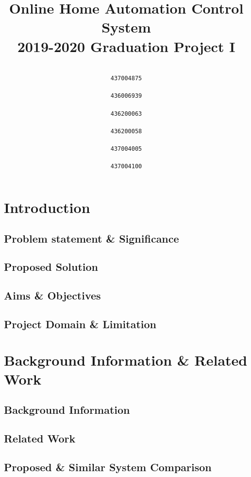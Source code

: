 \documentclass{article}
\date{}
\title{
	Online Home Automation Control System \\
	\large 2019-2020 Graduation Project I }
\author{
	\setcode{utf8}
	\RL{ريم علي الغامدي} 
	\\\texttt{437004875}
	\\[3ex]
	\RL{ساره خالد آل حسين} 
	\\\texttt{436006939}
	\\[3ex]
	\RL{ضحى نضال الزعبي} 
	\\\texttt{436200063}
	\\[3ex]
	\RL{عبير أحمد عزت} 
	\\\texttt{436200058}
	\\[3ex]
	\RL{منى سعود الخثلان} 
	\\\texttt{437004005}
	\\[3ex]
	\RL{نوف عبد الله الدعجاني} 
	\\\texttt{437004100}
}
\begin{document}
	
	
	\maketitle
	\newpage

	
	\tableofcontents
	\newpage	
	\doublespacing
	\newpage
	


	\section{Introduction}
		\subsection{Problem statement \& Significance}
		\subsection{Proposed Solution}
		\subsection{Aims \& Objectives}
		\subsection{Project Domain \& Limitation}
		\newpage	
	\section{Background Information \& Related Work}
		\subsection{Background Information}
		\subsection{Related Work}
		\subsection{Proposed \& Similar System Comparison}
		\newpage	
\end{document}
